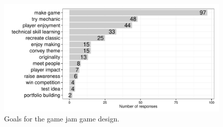 \documentclass{sig-alternate}
\begin{document}

\begin{figure}[bp]
\centering
\includegraphics[width=\linewidth]{./goals}
\caption{Goals for the game jam game design.}
\label{fig:goals}
\end{figure}
\end{document}
